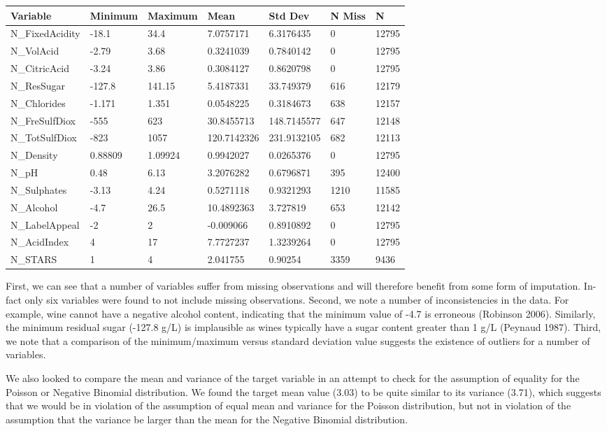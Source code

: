 \documentclass[]{article}
\begin{document}
\begin{longtable}[]{@{}lllllll@{}}
\toprule
Variable & Minimum & Maximum & Mean & Std Dev & N Miss &
N\tabularnewline
\midrule
\endhead
N\_FixedAcidity & -18.1 & 34.4 & 7.0757171 & 6.3176435 & 0 &
12795\tabularnewline
N\_VolAcid & -2.79 & 3.68 & 0.3241039 & 0.7840142 & 0 &
12795\tabularnewline
N\_CitricAcid & -3.24 & 3.86 & 0.3084127 & 0.8620798 & 0 &
12795\tabularnewline
N\_ResSugar & -127.8 & 141.15 & 5.4187331 & 33.749379 & 616 &
12179\tabularnewline
N\_Chlorides & -1.171 & 1.351 & 0.0548225 & 0.3184673 & 638 &
12157\tabularnewline
N\_FreSulfDiox & -555 & 623 & 30.8455713 & 148.7145577 & 647 &
12148\tabularnewline
N\_TotSulfDiox & -823 & 1057 & 120.7142326 & 231.9132105 & 682 &
12113\tabularnewline
N\_Density & 0.88809 & 1.09924 & 0.9942027 & 0.0265376 & 0 &
12795\tabularnewline
N\_pH & 0.48 & 6.13 & 3.2076282 & 0.6796871 & 395 & 12400\tabularnewline
N\_Sulphates & -3.13 & 4.24 & 0.5271118 & 0.9321293 & 1210 &
11585\tabularnewline
N\_Alcohol & -4.7 & 26.5 & 10.4892363 & 3.727819 & 653 &
12142\tabularnewline
N\_LabelAppeal & -2 & 2 & -0.009066 & 0.8910892 & 0 &
12795\tabularnewline
N\_AcidIndex & 4 & 17 & 7.7727237 & 1.3239264 & 0 & 12795\tabularnewline
N\_STARS & 1 & 4 & 2.041755 & 0.90254 & 3359 & 9436\tabularnewline
\bottomrule
\end{longtable}

First, we can see that a number of variables suffer from missing
observations and will therefore benefit from some form of imputation.
In-fact only six variables were found to not include missing
observations. Second, we note a number of inconsistencies in the data.
For example, wine cannot have a negative alcohol content, indicating
that the minimum value of -4.7 is erroneous (Robinson 2006). Similarly,
the minimum residual sugar (-127.8 g/L) is implausible as wines
typically have a sugar content greater than 1 g/L (Peynaud 1987). Third,
we note that a comparison of the minimum/maximum versus standard
deviation value suggests the existence of outliers for a number of
variables.

We also looked to compare the mean and variance of the target variable
in an attempt to check for the assumption of equality for the Poisson or
Negative Binomial distribution. We found the target mean value (3.03) to
be quite similar to its variance (3.71), which suggests that we would be
in violation of the assumption of equal mean and variance for the
Poisson distribution, but not in violation of the assumption that the
variance be larger than the mean for the Negative Binomial distribution.
\end{document}
